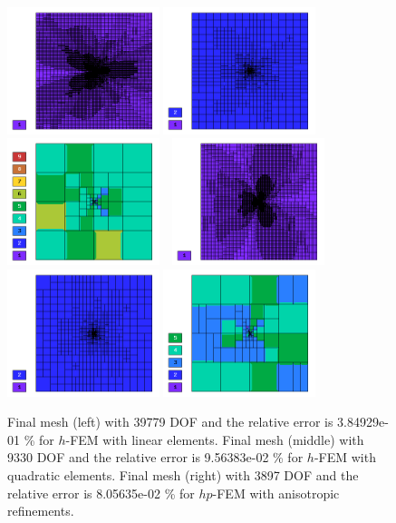 \documentclass[12pt]{elsarticle}
\begin{document}
\begin{figure}[!ht]
\centering
\includegraphics[height=3.7cm]{nist/nist-3/mesh_u_h1_aniso.png}
\includegraphics[height=3.7cm]{nist/nist-3/mesh_u_h2_aniso.png}
\includegraphics[height=3.7cm]{nist/nist-3/mesh_u_hp_anisoh.png}\ \
\includegraphics[height=3.7cm]{nist/nist-3/mesh_v_h1_aniso.png}
\includegraphics[height=3.7cm]{nist/nist-3/mesh_v_h2_aniso.png}
\includegraphics[height=3.7cm]{nist/nist-3/mesh_v_hp_anisoh.png}
\caption{
Final mesh (left) with 39779 DOF and the relative error is 3.84929e-01 \% for $h$-FEM with linear elements.
Final mesh (middle) with 9330 DOF and the relative error is 9.56383e-02 \% for $h$-FEM with quadratic elements.
Final mesh (right) with 3897 DOF and the relative error is 8.05635e-02 \% for $hp$-FEM with anisotropic refinements.}
\label{fig:nist-3-hp-aniso}
\end{figure}
\end{document}
